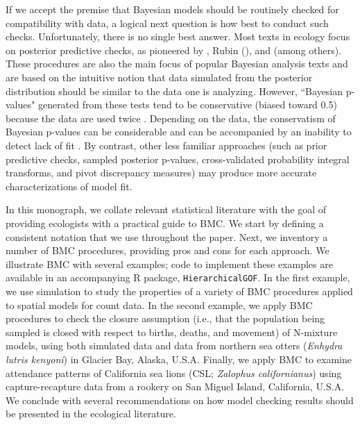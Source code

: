 \documentclass[12pt,english]{article}
\begin{document}
\begin{spacing}{1.9}
If we accept the premise that Bayesian models should be routinely
checked for compatibility with data, a logical next question is how
best to conduct such checks.  Unfortunately, there is no single best
answer.  Most texts in ecology
\citep[e.g.,][]{KingEtAl2009,LinkBarker2010,KerySchaub2012} focus on
posterior predictive checks, as pioneered by \citet{Guttman1967},
Rubin (\citeyear{Rubin1981,Rubin1984}), and \citet{GelmanEtAl1996}
(among others).  These procedures are also the main focus of popular
Bayesian analysis texts
\citep[e.g.,][]{CressieWikle2011,GelmanEtAl2014} and are based on the
intuitive notion that data simulated from the posterior distribution
should be similar to the data one is analyzing.  However, ``Bayesian
p-values" generated from these tests tend to be conservative (biased
toward 0.5) because the data are used twice \citep[once to fit the
model and once to test the
model;][]{BayarriBerger2000,RobinsEtAl2000}.  Depending on the data,
the conservatism of Bayesian p-values can be considerable
\citep{Zhang2014} and can be accompanied by an inability to detect lack
of fit \citep{YuanJohnson2012,Zhang2014}. By contrast, other less
familiar approaches (such as prior predictive checks, sampled
posterior p-values, cross-validated probability integral transforms,
and pivot discrepancy measures) may produce more accurate
characterizations of model fit.

In this monograph, we collate relevant statistical literature with the
goal of providing ecologists with a practical guide to BMC.  We start
by defining a consistent notation that we use throughout the
paper. Next, we inventory a number of BMC procedures, providing pros
and cons for each approach.  We illustrate BMC with several examples;
code to implement these examples are available in an accompanying R
package, \texttt{HierarchicalGOF}.  In the first example, we use
simulation to study the properties of a variety of BMC procedures
applied to spatial models for count data.  In the second example, we
apply BMC procedures to check the closure assumption (i.e., that the
population being sampled is closed with respect to births, deaths, and
movement) of N-mixture models, using both simulated data and data from
northern sea otters (\textit{Enhydra lutris kenyoni}) in Glacier Bay,
Alaska, U.S.A.  Finally, we apply BMC to examine attendance patterns
of California sea lions (CSL; {\it Zalophus californianus}) using
capture-recapture data from a rookery on San Miguel Island,
California, U.S.A.  We conclude with several recommendations on how
model checking results should be presented in the ecological
literature.




\end{spacing}
\end{document}
